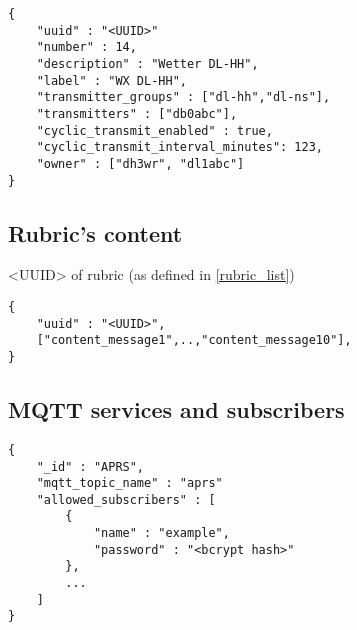 \begin{lstlisting}
{
   	"uuid" : "<UUID>"
    "number" : 14,
    "description" : "Wetter DL-HH",
    "label" : "WX DL-HH",
    "transmitter_groups" : ["dl-hh","dl-ns"],
    "transmitters" : ["db0abc"],
	"cyclic_transmit_enabled" : true,
    "cyclic_transmit_interval_minutes": 123,
 	"owner" : ["dh3wr", "dl1abc"]
}
\end{lstlisting}

\subsection{Rubric's content}
<UUID> of rubric (as defined in \ref{rubric_list})

\begin{lstlisting}
{
	"uuid" : "<UUID>",
	["content_message1",..,"content_message10"],
}
\end{lstlisting}

\subsection{MQTT services and subscribers}
\label{protocoldef:couchdb:mqttservicesandsubscribers}
\begin{lstlisting}
{
	"_id" : "APRS",
	"mqtt_topic_name" : "aprs"
	"allowed_subscribers" : [
		{
			"name" : "example",
			"password" : "<bcrypt hash>"
		},
		...
	]
}
\end{lstlisting}


